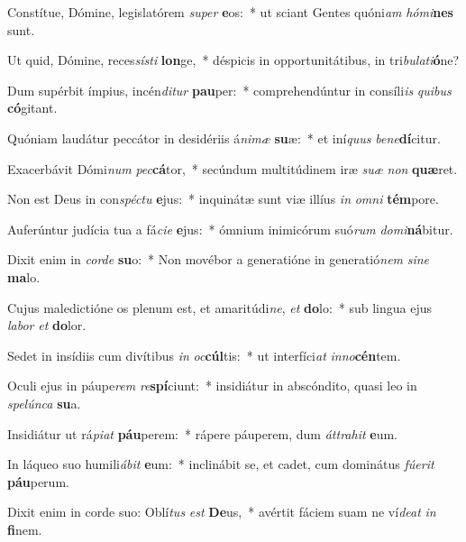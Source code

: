 \item Constítue, Dómine, legislatórem \textit{su}\textit{per} \textbf{e}os:~* ut sciant Gentes quóni\textit{am} \textit{hó}\textit{mi}\textbf{nes} sunt.
\item Ut quid, Dómine, reces\textit{sís}\textit{ti} \textbf{lon}ge,~* déspicis in opportunitátibus, in tri\textit{bu}\textit{la}\textit{ti}\textbf{ó}ne?
\item Dum supérbit ímpius, incén\textit{di}\textit{tur} \textbf{pau}per:~* comprehendúntur in consíli\textit{is} \textit{qui}\textit{bus} \textbf{có}gitant.
\item Quóniam laudátur peccátor in desidériis á\textit{ni}\textit{mæ} \textbf{su}æ:~* et iní\textit{quus} \textit{be}\textit{ne}\textbf{dí}citur.
\item Exacerbávit Dómi\textit{num} \textit{pec}\textbf{cá}tor,~* secúndum multitúdinem iræ \textit{su}\textit{æ} \textit{non} \textbf{quæ}ret.
\item Non est Deus in con\textit{spéc}\textit{tu} \textbf{e}jus:~* inquinátæ sunt viæ illíus \textit{in} \textit{om}\textit{ni} \textbf{tém}pore.
\item Auferúntur judícia tua a fá\textit{ci}\textit{e} \textbf{e}jus:~* ómnium inimicórum suó\textit{rum} \textit{do}\textit{mi}\textbf{ná}bitur.
\item Dixit enim in \textit{cor}\textit{de} \textbf{su}o:~* Non movébor a generatióne in generatió\textit{nem} \textit{si}\textit{ne} \textbf{ma}lo.
\item Cujus maledictióne os plenum est, et amaritúdi\textit{ne}, \textit{et} \textbf{do}lo:~* sub lingua ejus \textit{la}\textit{bor} \textit{et} \textbf{do}lor.
\item Sedet in insídiis cum divítibus \textit{in} \textit{oc}\textbf{cúl}tis:~* ut interfíci\textit{at} \textit{in}\textit{no}\textbf{cén}tem.
\item Oculi ejus in páupe\textit{rem} \textit{re}\textbf{spí}ciunt:~* insidiátur in abscóndito, quasi leo in \textit{spe}\textit{lún}\textit{ca} \textbf{su}a.
\item Insidiátur ut rá\textit{pi}\textit{at} \textbf{páu}perem:~* rápere páuperem, dum \textit{át}\textit{tra}\textit{hit} \textbf{e}um.
\item In láqueo suo humili\textit{á}\textit{bit} \textbf{e}um:~* inclinábit se, et cadet, cum dominátus \textit{fú}\textit{e}\textit{rit} \textbf{páu}perum.
\item Dixit enim in corde suo: Oblí\textit{tus} \textit{est} \textbf{De}us,~* avértit fáciem suam ne ví\textit{de}\textit{at} \textit{in} \textbf{fi}nem.
